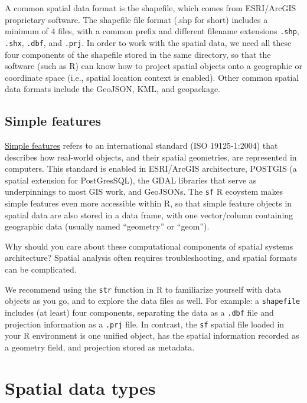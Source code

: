 \documentclass[
  letterpaper,
  DIV=11,
  numbers=noendperiod]{scrreprt}
\begin{document}
A common spatial data format is the shapefile, which comes from
ESRI/ArcGIS proprietary software. The shapefile file format (.shp for
short) includes a minimum of 4 files, with a common prefix and different
filename extensions \texttt{.shp}, \texttt{.shx}, \texttt{.dbf}, and
\texttt{.prj}. In order to work with the spatial data, we need all these
four components of the shapefile stored in the same directory, so that
the software (such as R) can know how to project spatial objects onto a
geographic or coordinate space (i.e., spatial location context is
enabled). Other common spatial data formats include the GeoJSON, KML,
and geopackage.

\subsection{Simple features}\label{simple-features}

\href{https://r-spatial.github.io/sf/articles/sf1.html}{Simple features}
refers to an international standard (ISO 19125-1:2004) that describes
how real-world objects, and their spatial geometries, are represented in
computers. This standard is enabled in ESRI/ArcGIS architecture, POSTGIS
(a spatial extension for PostGresSQL), the GDAL libraries that serve as
underpinnings to most GIS work, and GeoJSONs. The \texttt{sf} R ecoystem
makes simple features even more accessible within R, so that simple
feature objects in spatial data are also stored in a data frame, with
one vector/column containing geographic data (usually named ``geometry''
or ``geom'').

Why should you care about these computational components of spatial
systems architecture? Spatial analysis often requires troubleshooting,
and spatial formats can be complicated.

We recommend using the \texttt{str} function in R to familiarize
yourself with data objects as you go, and to explore the data files as
well. For example: a \texttt{shapefile} includes (at least) four
components, separating the data as a \texttt{.dbf} file and projection
information as a \texttt{.prj} file. In contrast, the \texttt{sf}
spatial file loaded in your R environment is one unified object, has the
spatial information recorded as a geometry field, and projection stored
as metadata.

\section{Spatial data types}\label{spatial-data-types}
\end{document}
